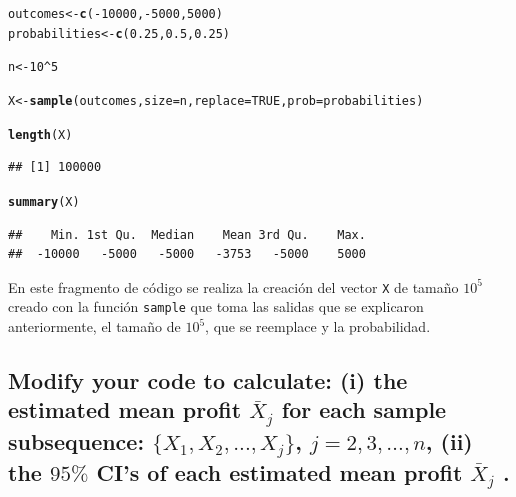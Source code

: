 \documentclass[12pt]{article}\usepackage[]{graphicx}\usepackage[]{xcolor}
\makeatletter
\newcommand{\hlnum}[1]{\textcolor[rgb]{0.686,0.059,0.569}{#1}}%
\newcommand{\hlopt}[1]{\textcolor[rgb]{0,0,0}{#1}}%
\newcommand{\hldef}[1]{\textcolor[rgb]{0.345,0.345,0.345}{#1}}%
\newcommand{\hlkwb}[1]{\textcolor[rgb]{0.69,0.353,0.396}{#1}}%
\newcommand{\hlkwc}[1]{\textcolor[rgb]{0.333,0.667,0.333}{#1}}%
\newcommand{\hlkwd}[1]{\textcolor[rgb]{0.737,0.353,0.396}{\textbf{#1}}}%
\newenvironment{kframe}{%
 \def\at@end@of@kframe{}%
 \ifinner\ifhmode%
  \def\at@end@of@kframe{\end{minipage}}%
  \begin{minipage}{\columnwidth}%
 \fi\fi%
 \def\FrameCommand##1{\hskip\@totalleftmargin \hskip-\fboxsep
 \colorbox{shadecolor}{##1}\hskip-\fboxsep
     \hskip-\linewidth \hskip-\@totalleftmargin \hskip\columnwidth}%
 \MakeFramed {\advance\hsize-\width
   \@totalleftmargin\z@ \linewidth\hsize
   \@setminipage}}%
 {\par\unskip\endMakeFramed%
 \at@end@of@kframe}
\newenvironment{knitrout}{}{} %
\makeatother
\begin{document}
\begin{knitrout}
\color{fgcolor}\begin{kframe}
\begin{alltt}
\hldef{outcomes} \hlkwb{<-} \hlkwd{c}\hldef{(}\hlopt{-}\hlnum{10000}\hldef{,} \hlopt{-}\hlnum{5000}\hldef{,} \hlnum{5000}\hldef{)}
\hldef{probabilities} \hlkwb{<-} \hlkwd{c}\hldef{(}\hlnum{0.25}\hldef{,} \hlnum{0.5}\hldef{,} \hlnum{0.25}\hldef{)}

\hldef{n} \hlkwb{<-} \hlnum{10}\hlopt{^}\hlnum{5}

\hldef{X} \hlkwb{<-} \hlkwd{sample}\hldef{(outcomes,} \hlkwc{size} \hldef{= n ,} \hlkwc{replace} \hldef{=} \hlnum{TRUE}\hldef{,} \hlkwc{prob} \hldef{= probabilities)}

\hlkwd{length}\hldef{(X)}
\end{alltt}
\begin{verbatim}
## [1] 100000
\end{verbatim}
\begin{alltt}
\hlkwd{summary}\hldef{(X)}
\end{alltt}
\begin{verbatim}
##    Min. 1st Qu.  Median    Mean 3rd Qu.    Max. 
##  -10000   -5000   -5000   -3753   -5000    5000
\end{verbatim}
\end{kframe}
\end{knitrout}

En este fragmento de código se realiza la creación del vector \lstinline|X| de tamaño $10^{5}$ creado con la función \lstinline|sample| que toma las salidas que se explicaron anteriormente, el tamaño de $10^{5}$, que se reemplace y la probabilidad.


\subsection{Modify your code to calculate: (i) the estimated mean profit $\bar{X}_{j}$ for each sample subsequence: $\{X_{1}, X_{2}, . . . , X_{j} \}$, $j = 2, 3, \dots, n$, (ii) the $95 \%$ CI’s of each estimated mean profit $\bar{X}_{j}$ .}
\end{document}
